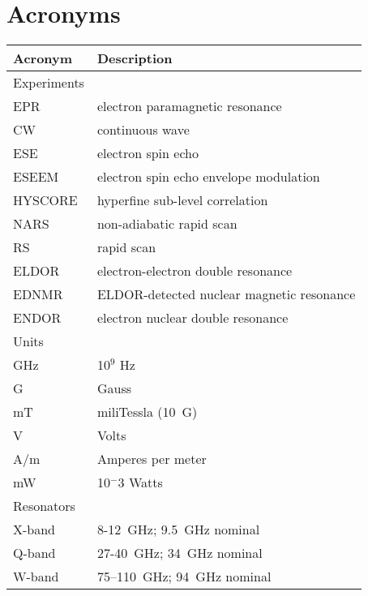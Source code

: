 \documentclass[11pt,a4paper,openany,twoside,english,titlepage=true]{scrbook}
\begin{document}
\listoffigures\newpage

\listoftables\newpage

\newpage
\chapter*{Acronyms}
\begin{table}[ht]
\vspace{-0.5em}
\begin{tabular}{ll}
\textbf{Acronym}     & \textbf{Description} \\ \hline \hline
\rowcolor{LightCyan}
Experiments     & \\ \hline
EPR             & electron paramagnetic resonance \\
CW              & continuous wave \\
ESE             & electron spin echo \\
ESEEM           & electron spin echo envelope modulation \\
HYSCORE         & hyperfine sub-level correlation \\
NARS            & non-adiabatic rapid scan \\
RS              & rapid scan \\
ELDOR           & electron-electron double resonance \\
EDNMR           & ELDOR-detected nuclear magnetic resonance \\
ENDOR           & electron nuclear double resonance \\ \hline \hline
\rowcolor{LightCyan}
Units           & \\ \hline
GHz             & 10$^9$ Hz \\
G               & Gauss \\
mT              & miliTessla (10~G) \\
V               & Volts \\
A/m             & Amperes per meter \\
mW              & 10$^-3$ Watts \\ \hline \hline
\rowcolor{LightCyan}
Resonators      & \\ \hline
X-band          & 8-12~GHz; 9.5~GHz nominal \\ 
Q-band          & 27-40~GHz; 34~GHz nominal \\ 
W-band          & 75–110~GHz; 94~GHz nominal \\  

\end{tabular}
\end{table}
\end{document}
